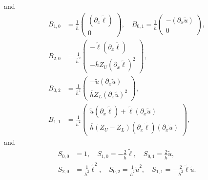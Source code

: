 and 
\begin{align*}
B_{1,0}&=
\frac{1}{\overline{h}}\begin{pmatrix} (\partial_x \tilde{\ell}) \\0\end{pmatrix},\quad
B_{0,1}=
\frac{1}{\overline{h}}\begin{pmatrix} -(\partial_x \tilde{u}) \\0\end{pmatrix},\\
B_{2,0}&=
\frac{1}{\overline{h}^2}\begin{pmatrix} -\tilde{\ell}(\partial_x \tilde{\ell}) \\
-\overline{h}Z_U(\partial_x \tilde{\ell})^2\end{pmatrix},\\
B_{0,2}&=
\frac{1}{\overline{h}^2}\begin{pmatrix} -\tilde{u}(\partial_x \tilde{u}) \\
\overline{h}Z_L(\partial_x \tilde{u})^2\end{pmatrix},\\
B_{1,1}&=
\frac{1}{\overline{h}^2}\begin{pmatrix} \tilde{u}(\partial_x \tilde{\ell}) + \tilde{\ell}(\partial_x \tilde{u}) \\
\overline{h}(Z_U-Z_L)(\partial_x \tilde{\ell})(\partial_x \tilde{u})\end{pmatrix},
\end{align*}
and
\begin{align*}
S_{0,0}&=1,\quad S_{1,0}=-\frac{2}{\overline{h}}\tilde{\ell},\quad S_{0,1}=\frac{2}{\overline{h}}\tilde{u},\\
S_{2,0}&=\frac{1}{\overline{h}^2}\tilde{\ell}^2,\quad S_{0,2}=\frac{1}{\overline{h}^2}\tilde{u}^2,\quad S_{1,1}=-\frac{2}{\overline{h}^2}\tilde{\ell}\tilde{u}.
\end{align*}
\clearpage